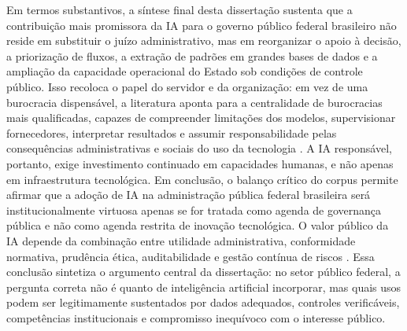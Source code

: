 \documentclass[12pt,a4paper]{article}
\begin{document}
Em termos substantivos, a síntese final desta dissertação sustenta que a contribuição mais promissora da IA para o governo público federal brasileiro não reside em substituir o juízo administrativo, mas em reorganizar o apoio à decisão, a priorização de fluxos, a extração de padrões em grandes bases de dados e a ampliação da capacidade operacional do Estado sob condições de controle público. Isso recoloca o papel do servidor e da organização: em vez de uma burocracia dispensável, a literatura aponta para a centralidade de burocracias mais qualificadas, capazes de compreender limitações dos modelos, supervisionar fornecedores, interpretar resultados e assumir responsabilidade pelas consequências administrativas e sociais do uso da tecnologia \autocite{criado2024artificial} \autocite{melo2026competencias}. A IA responsável, portanto, exige investimento continuado em capacidades humanas, e não apenas em infraestrutura tecnológica.
Em conclusão, o balanço crítico do corpus permite afirmar que a adoção de IA na administração pública federal brasileira será institucionalmente virtuosa apenas se for tratada como agenda de governança pública e não como agenda restrita de inovação tecnológica. O valor público da IA depende da combinação entre utilidade administrativa, conformidade normativa, prudência ética, auditabilidade e gestão contínua de riscos \autocite{batool2025ai} \autocite{mkander2023auditing} \autocite{parycek2023artificial}. Essa conclusão sintetiza o argumento central da dissertação: no setor público federal, a pergunta correta não é quanto de inteligência artificial incorporar, mas quais usos podem ser legitimamente sustentados por dados adequados, controles verificáveis, competências institucionais e compromisso inequívoco com o interesse público.
\end{document}
